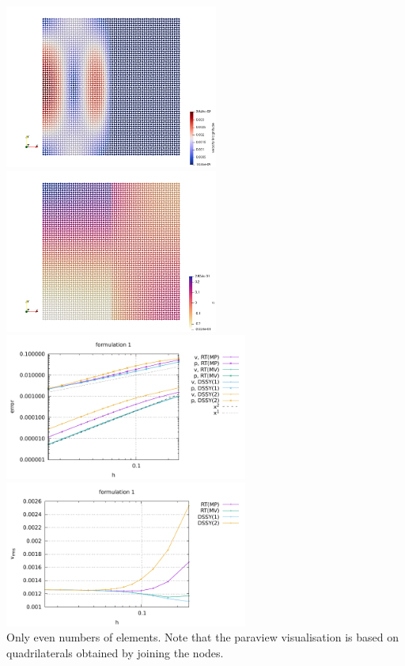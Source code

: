 \begin{itemize}
\begin{center}
\includegraphics[width=7cm]{python_codes/fieldstone_77/results/solcx/vel}
\includegraphics[width=7cm]{python_codes/fieldstone_77/results/solcx/press}\\
\includegraphics[width=8cm]{python_codes/fieldstone_77/results/solcx/errors_form1}
\includegraphics[width=8cm]{python_codes/fieldstone_77/results/solcx/vrms_form1}\\
{\captionfont Only even numbers of elements. Note that the paraview visualisation is based on 
quadrilaterals obtained by joining the nodes.}
\end{center}


\end{itemize}


